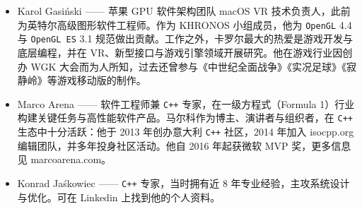 \begin{itemize}
\item Karol Gasiński —— 苹果 GPU 软件架构团队 macOS VR 技术负责人，此前为英特尔高级图形软件工程师。作为 KHRONOS 小组成员，他为 \texttt{OpenGL} 4.4 与 \texttt{OpenGL ES} 3.1 规范做出贡献。工作之外，卡罗尔最大的热爱是游戏开发与底层编程，并在 VR、新型接口与游戏引擎领域开展研究。他在游戏行业因创办 WGK 大会而为人所知，过去还曾参与《中世纪全面战争》《实况足球》《寂静岭》等游戏移动版的制作。

\item Marco Arena —— 软件工程师兼 \texttt{C++} 专家，在一级方程式（Formula 1）行业构建关键任务与高性能软件产品。马尔科作为博主、演讲者与组织者，在 \texttt{C++} 生态中十分活跃：他于 2013 年创办意大利 \texttt{C++} 社区，2014 年加入 isocpp.org 编辑团队，并多年投身社区活动。他自 2016 年起获微软 MVP 奖，更多信息见 marcoarena.com。

\item Konrad Jaśkowiec —— \texttt{C++} 专家，当时拥有近 8 年专业经验，主攻系统设计与优化。可在 Linkedin 上找到他的个人资料。
\end{itemize}
